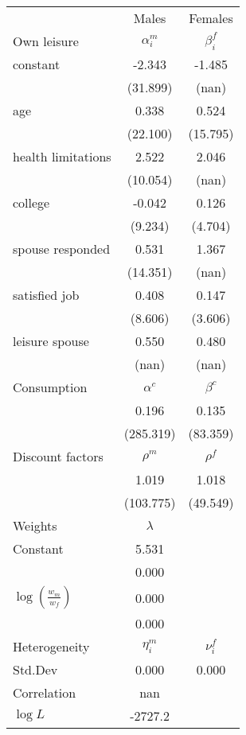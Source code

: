 \begin{tabular}{lcc} 
\hline\hline 
 & Males & Females \\ 
Own leisure & $\alpha_{i}^{m}$ & $\beta_{i}^{f}$ \\ 
constant & -2.343 & -1.485 \\ 
 & (31.899) & (nan) \\ 
age & 0.338 & 0.524 \\ 
 & (22.100) & (15.795) \\ 
health limitations & 2.522 & 2.046 \\ 
 & (10.054) & (nan) \\ 
college & -0.042 & 0.126 \\ 
 & (9.234) & (4.704) \\ 
spouse responded & 0.531 & 1.367 \\ 
 & (14.351) & (nan) \\ 
satisfied job & 0.408 & 0.147 \\ 
 & (8.606) & (3.606) \\ 
leisure spouse & 0.550 & 0.480 \\ 
 & (nan) & (nan) \\ 
Consumption & $\alpha^{c}$ & $\beta^{c}$ \\ 
 & 0.196 & 0.135 \\ 
 & (285.319) & (83.359) \\ 
Discount factors & $\rho^m$ & $\rho^f$ \\ 
 & 1.019 & 1.018 \\ 
 & (103.775) & (49.549) \\ 
Weights & $\lambda$ &  \\ 
Constant & 5.531 &  \\ 
 & 0.000 &  \\ 
$\log(\frac{w_m}{w_f})$ & 0.000 &  \\ 
 & 0.000 &  \\ 
Heterogeneity & $\eta_i^m$ & $\nu_i^f$ \\ 
Std.Dev & 0.000 & 0.000 \\ 
Correlation & nan &  \\ 
\hline 
$\log L$ & -2727.2 & \\ 
\hline \hline 
\end{tabular} 
